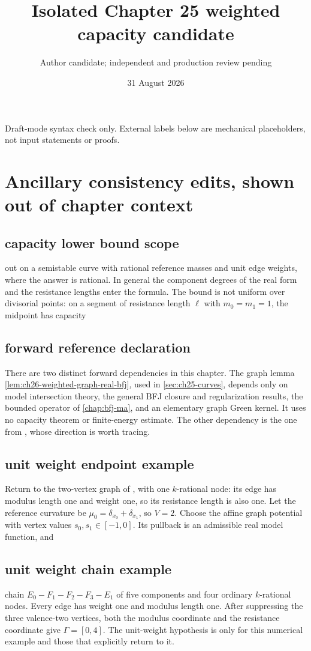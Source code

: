 \documentclass[11pt]{article}
\title{Isolated Chapter 25 weighted capacity candidate}
\author{Author candidate; independent and production review pending}
\date{31 August 2026}
\begin{document}
\maketitle
\noindent Draft-mode syntax check only. External labels below are
mechanical placeholders, not input statements or proofs.


\section*{Ancillary consistency edits, shown out of chapter context}

\subsection*{capacity lower bound scope}
out on a semistable curve with rational reference masses and unit edge
weights, where the answer is rational.  In general the component degrees
of the real form and the resistance lengths enter the formula.  The bound
is not uniform over divisorial points: on a segment of resistance length
\(\ell\) with \(m_0=m_1=1\), the midpoint has capacity

\subsection*{forward reference declaration}
There are two distinct forward dependencies in this chapter.
The graph lemma \cref{lem:ch26-weighted-graph-real-bfj}, used in
\cref{sec:ch25-curves}, depends only on model intersection theory,
the general BFJ closure and regularization results, the bounded operator
of \cref{chap:bfj-ma}, and an elementary graph Green kernel.
It uses no capacity theorem or finite-energy estimate.
The other dependency is the one from ,
whose direction is worth tracing.

\subsection*{unit weight endpoint example}
Return to the two-vertex graph of , with one
\(k\)-rational node: its edge has modulus length one and weight one,
so its resistance length is also one.  Let the reference curvature be
\(\mu_0=\delta_{x_0}+\delta_{x_1}\), so \(V=2\).
Choose the affine graph potential with vertex values
\(s_0,s_1\in[-1,0]\).  Its pullback is an admissible real model
function, and

\subsection*{unit weight chain example}
chain \(E_0-F_1-F_2-F_3-E_1\) of five components and four ordinary
\(k\)-rational nodes.  Every edge has weight one and modulus length
one.  After suppressing the three valence-two vertices, both the
modulus coordinate and the resistance coordinate give
\(\Gamma=[0,4]\).  The unit-weight hypothesis is only for this
numerical example and those that explicitly return to it.
\end{document}
